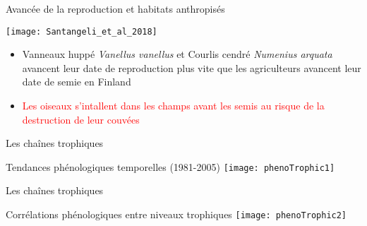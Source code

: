 \documentclass[10pt]{beamer}
\begin{document}
\begin{frame}{Avancée de la reproduction et habitats anthropisés}
    
  \begin{center}  
    \vspace{10pt}
    \texttt{[image: Santangeli\_et\_al\_2018]}
  \end{center}
  \begin{itemize}[<+->]
   \item  Vanneaux huppé \textit{Vanellus vanellus} et Courlis cendré \textit{Numenius arquata} avancent leur date de reproduction plus vite que les agriculteurs avancent leur date de semie en Finland
\item \textcolor{red}{Les oiseaux s'intallent dans les champs avant les semis au risque de la destruction de leur couvées}
  \end{itemize}

  \begin{tiny}
    \cite{Santangeli2018}

  \end{tiny}
\end{frame}





\begin{frame}{Les chaînes trophiques}
  \begin{center}
    Tendances phénologiques temporelles (1981-2005)
    \vspace{5pt}
    \texttt{[image: phenoTrophic1]}
  \end{center}
  \begin{tiny}
    \cite{Both2009}
  \end{tiny}
\end{frame}

\begin{frame}{Les chaînes trophiques}
  \begin{center}
    Corrélations phénologiques entre niveaux trophiques
    \vspace{5pt}
    \texttt{[image: phenoTrophic2]}
  \end{center}
  \begin{tiny}
    \cite{Both2009}
  \end{tiny}
\end{frame}
\end{document}

